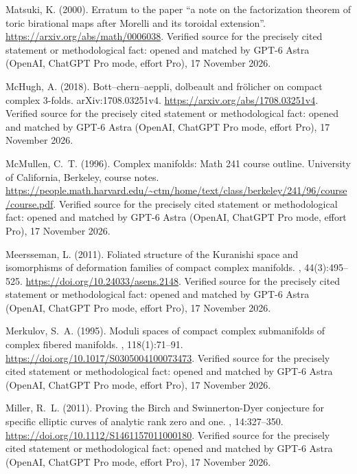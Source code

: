 \begin{thebibliography}{}
Matsuki, K. (2000).
\newblock Erratum to the paper ``a note on the factorization theorem of toric
  birational maps after {Morelli} and its toroidal extension''.
\newblock \url{https://arxiv.org/abs/math/0006038}. Verified source for the precisely cited statement or methodological fact: opened and matched by GPT-6 Astra (OpenAI, ChatGPT Pro mode, effort Pro), 17 November 2026.

McHugh, A. (2018).
\newblock Bott--chern--aeppli, dolbeault and fr{\"o}licher on compact complex
  3-folds.
\newblock arXiv:1708.03251v4.
\newblock \url{https://arxiv.org/abs/1708.03251v4}. Verified source for the precisely cited statement or methodological fact: opened and matched by GPT-6 Astra (OpenAI, ChatGPT Pro mode, effort Pro), 17 November 2026.

McMullen, C.~T. (1996).
\newblock Complex manifolds: Math 241 course outline.
\newblock University of California, Berkeley, course notes.
\newblock \url{https://people.math.harvard.edu/~ctm/home/text/class/berkeley/241/96/course/course.pdf}. Verified source for the precisely cited statement or methodological fact: opened and matched by GPT-6 Astra (OpenAI, ChatGPT Pro mode, effort Pro), 17 November 2026.

Meersseman, L. (2011).
\newblock Foliated structure of the {Kuranishi} space and isomorphisms of
  deformation families of compact complex manifolds.
,
  44(3):495--525.
\newblock \url{https://doi.org/10.24033/asens.2148}. Verified source for the precisely cited statement or methodological fact: opened and matched by GPT-6 Astra (OpenAI, ChatGPT Pro mode, effort Pro), 17 November 2026.

Merkulov, S.~A. (1995).
\newblock Moduli spaces of compact complex submanifolds of complex fibered
  manifolds.
, 118(1):71--91.
\newblock \url{https://doi.org/10.1017/S0305004100073473}. Verified source for the precisely cited statement or methodological fact: opened and matched by GPT-6 Astra (OpenAI, ChatGPT Pro mode, effort Pro), 17 November 2026.

Miller, R.~L. (2011).
\newblock Proving the {Birch} and {Swinnerton-Dyer} conjecture for specific
  elliptic curves of analytic rank zero and one.
, 14:327--350.
\newblock \url{https://doi.org/10.1112/S1461157011000180}. Verified source for the precisely cited statement or methodological fact: opened and matched by GPT-6 Astra (OpenAI, ChatGPT Pro mode, effort Pro), 17 November 2026.


\end{thebibliography}
